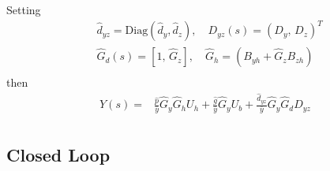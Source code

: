 \documentclass[letterpaper, 10 pt,  conference]{ieeeconf}  %
\begin{document}
Setting
\begin{equation*}
\begin{aligned}
&\hat d_{yz}=\text{Diag}({\hat{d}_y,\hat{d}_z}),\quad D_{yz}(s)=\left(D_y,\, D_z\right)^T\\
&\hat G_d(s)=[1,\, \hat G_z],\quad \hat G_h=(B_{yh}+\hat G_zB_{zh})\\
\end{aligned}
\end{equation*}
then
\begin{equation}\label{eq:ol_app}
\begin{aligned}
Y(s)=&\frac{\hat{p}}{\bar{y}}\hat G_y\hat G_hU_h+\frac{\hat{g}}{\bar{y}}\hat G_yU_b+\frac{\hat d_{yz}}{\bar{y}}\hat G_y\hat G_dD_{yz}\\
\end{aligned}
\end{equation}


\subsection{Closed Loop}
\end{document}
